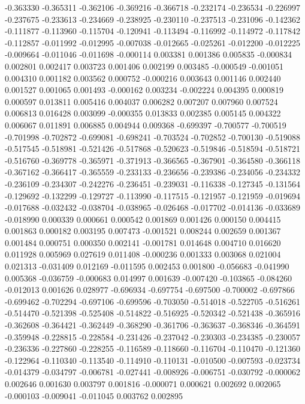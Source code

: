 -0.363330
-0.365311
-0.362106
-0.369216
-0.366718
-0.232174
-0.236534
-0.226997
-0.237675
-0.233613
-0.234669
-0.238925
-0.230110
-0.237513
-0.231096
-0.142362
-0.111877
-0.113960
-0.115704
-0.120941
-0.113494
-0.116992
-0.114972
-0.117842
-0.112857
-0.011992
-0.012995
-0.007038
-0.012665
-0.025261
-0.012200
-0.012225
-0.009664
-0.011046
-0.011698
-0.000114
0.003381
0.001386
0.005835
-0.000834
0.002801
0.002417
0.003723
0.001406
0.002199
0.003485
-0.000549
-0.001051
0.004310
0.001182
0.003562
0.000752
-0.000216
0.003643
0.001146
0.002440
0.001527
0.001065
0.001493
-0.000162
0.003234
-0.002224
0.004395
0.000819
0.000597
0.013811
0.005416
0.004037
0.006282
0.007207
0.007960
0.007524
0.006813
0.016428
0.003099
-0.000355
0.013833
0.002385
0.005145
0.004322
0.006067
0.011891
0.006885
0.004944
0.009368
-0.699397
-0.700577
-0.700519
-0.701998
-0.702872
-0.699081
-0.698241
-0.703524
-0.702852
-0.700130
-0.519088
-0.517545
-0.518981
-0.521426
-0.517868
-0.520623
-0.519846
-0.518594
-0.518721
-0.516760
-0.369778
-0.365971
-0.371913
-0.366565
-0.367901
-0.364580
-0.366118
-0.367162
-0.366417
-0.365559
-0.233133
-0.236656
-0.239386
-0.234056
-0.234332
-0.236109
-0.234307
-0.242276
-0.236451
-0.239031
-0.116338
-0.127345
-0.131564
-0.129692
-0.132299
-0.129727
-0.113990
-0.117515
-0.121957
-0.121959
-0.019694
-0.017688
-0.032432
-0.038704
-0.038965
-0.026468
-0.017702
-0.014136
-0.033689
-0.018990
0.000339
0.000661
0.000542
0.001869
0.001426
0.000150
0.004415
0.001863
0.000182
0.003195
0.007473
-0.001521
0.008244
0.002659
0.001367
0.001484
0.000751
0.000350
0.002141
-0.001781
0.014648
0.004710
0.016620
0.011928
0.005969
0.027619
0.011408
-0.000236
0.001333
0.003068
0.021004
0.021313
-0.031409
0.012169
-0.011595
0.002453
0.001800
-0.056683
-0.041990
0.005368
-0.036759
-0.000683
0.014997
0.001639
-0.007420
-0.103865
-0.084260
-0.012013
0.001626
0.028977
-0.696934
-0.697754
-0.697500
-0.700002
-0.697866
-0.699462
-0.702294
-0.697106
-0.699596
-0.703050
-0.514018
-0.522705
-0.516261
-0.514470
-0.521398
-0.525408
-0.514822
-0.516925
-0.520342
-0.521438
-0.365916
-0.362608
-0.364421
-0.362449
-0.368290
-0.361706
-0.363637
-0.368346
-0.364591
-0.359948
-0.228815
-0.228584
-0.231426
-0.237042
-0.230303
-0.234385
-0.230057
-0.236336
-0.227860
-0.228255
-0.116589
-0.118660
-0.116704
-0.110470
-0.121360
-0.122964
-0.110340
-0.113540
-0.114910
-0.110131
-0.010500
-0.007593
-0.023734
-0.014379
-0.034797
-0.006781
-0.027441
-0.008926
-0.006751
-0.030792
-0.000062
0.002646
0.001630
0.003797
0.001816
-0.000071
0.000621
0.002692
0.002065
-0.000103
-0.009041
-0.011045
0.003762
0.002895

